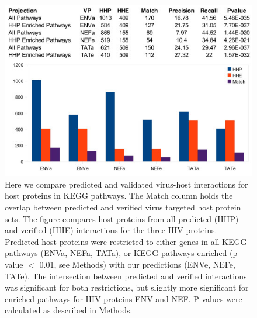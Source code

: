 
\begin{figure}
\begin{center}
\includegraphics[scale=.75]{figs/medGen_kegg}
\end{center}
\caption[Comparison of predicted and validated virus-host interactions
  for host proteins in KEGG pathways]{\small Here we compare predicted
  and validated virus-host interactions for host proteins in KEGG
  pathways. The Match column holds the overlap between predicted and
  verified virus targeted host protein sets. The figure compares host
  proteins from all predicted (HHP) and verified (HHE) interactions
  for the three HIV proteins. Predicted host proteins were restricted
  to either genes in all KEGG pathways (ENVa, NEFa, TATa), or KEGG
  pathways enriched (p-value $<$ 0.01, see Methods) with our
  predictions (ENVe, NEFe, TATe). The intersection between predicted
  and verified interactions was significant for both restrictions, but
  slightly more significant for enriched pathways for HIV proteins ENV
  and NEF. P-values were calculated as described in
  Methods. \label{fig:medGen:fig4}}
\end{figure}


